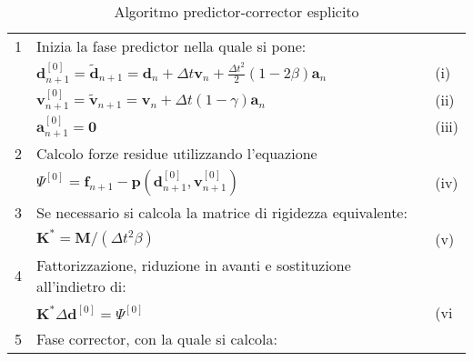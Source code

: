 \begin{table}
\caption{Algoritmo predictor-corrector esplicito}
\begin{tabular}{lll}
	\toprule
	1 & Inizia la fase predictor nella quale si pone:                                                                                                                             &        \\
	  & $\boldsymbol{d}_{n+1}^{[0]} = \boldsymbol{\tilde{d}}_{n+1} = \boldsymbol{d}_n + \varDelta t \boldsymbol{v}_n + \frac{\varDelta t^2 }{2} (1 - 2 \beta) \boldsymbol{a}_n$   & (i)    \\
	  & $\boldsymbol{v}_{n+1}^{[0]} = \boldsymbol{\tilde{v}}_{n+1} = \boldsymbol{v}_n + \varDelta t(1 - \gamma) \boldsymbol{a}_n $                                                & (ii)   \\
	  & $\boldsymbol{a}_{n+1}^{[0]} = \boldsymbol{0}$                                                                                                                             & (iii)  \\
	2 & Calcolo forze residue utilizzando l'equazione                                                                                                                             &        \\
  	  & $\boldsymbol{\varPsi}^{[0]} = \boldsymbol{f}_{n+1} - \boldsymbol{p}(\boldsymbol{d}_{n+1}^{[0]}, \boldsymbol{v}_{n+1}^{[0]})$                                              & (iv)   \\
	3 & Se necessario si calcola la matrice di rigidezza equivalente:                                                                                                             &        \\
	  & $\boldsymbol{K}^* = \boldsymbol{M}/(\varDelta t^2 \beta)$                                                                                                                 & (v)    \\
	4 & Fattorizzazione, riduzione in avanti e sostituzione all'indietro di:                                                                                                      &        \\
	  & $\boldsymbol{K}^* \varDelta \boldsymbol{d}^{[0]} = \boldsymbol{\varPsi}^{[0]}$                                                                                            & (vi    \\
	5 & Fase corrector, con la quale si calcola:                                                                                                                                  &        \\

\end{tabular}
\end{table}
